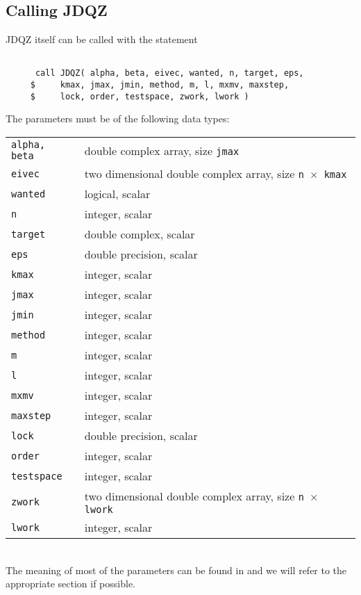 \documentclass[12pt,a4paper]{article}
\begin{document}
\subsection{Calling JDQZ}
JDQZ itself can be called with the statement
\begin{verbatim}
 
      call JDQZ( alpha, beta, eivec, wanted, n, target, eps,
     $     kmax, jmax, jmin, method, m, l, mxmv, maxstep,
     $     lock, order, testspace, zwork, lwork )

\end{verbatim}
The parameters must be of the following data types:

\noindent
\begin{tabular}{lp{10cm}}
{\tt alpha, beta}& double complex array, size {\tt jmax}\\
{\tt eivec}& two dimensional double complex array, size {\tt n $\times$ kmax}\\
{\tt wanted}& logical, scalar\\
{\tt n}& integer, scalar\\
{\tt target}& double complex, scalar\\
{\tt eps}& double precision, scalar\\
{\tt kmax}& integer, scalar\\
{\tt jmax}& integer, scalar\\
{\tt jmin}& integer, scalar\\
{\tt method}& integer, scalar\\
{\tt m}& integer, scalar\\
{\tt l}& integer, scalar\\
{\tt mxmv}& integer, scalar\\
{\tt maxstep}& integer, scalar\\
{\tt lock}& double precision, scalar\\
{\tt order}& integer, scalar\\
{\tt testspace}& integer, scalar\\
{\tt zwork}& two dimensional double complex array, size {\tt n $\times$ lwork}\\
{\tt lwork}& integer, scalar
\end{tabular}\\

\newpage
The meaning of most of the parameters can be found in \cite{jdqz} and we will
refer to the appropriate section if possible.\\
\end{document}
